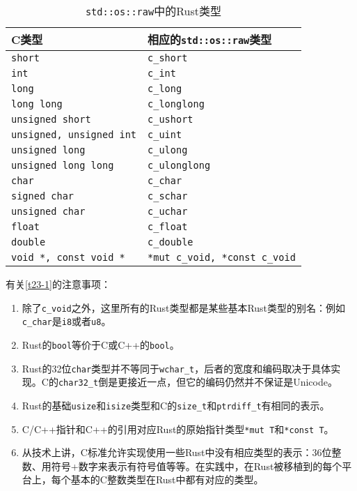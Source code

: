 \begin{table}[htbp]
    \centering
    \caption{\texttt{std::os::raw}中的Rust类型}
    \label{t23-1}
    \begin{tabular}{ll}
        \textbf{C类型}  &   \textbf{相应的\texttt{std::os::raw}类型}    \\
        \hline
        \texttt{short}          &   \texttt{c\_short}   \\
        \rowcolor{tablecolor}
        \texttt{int}            &   \texttt{c\_int}     \\
        \texttt{long}           &   \texttt{c\_long}    \\
        \rowcolor{tablecolor}
        \texttt{long long}      &   \texttt{c\_longlong}    \\
        \texttt{unsigned short} &   \texttt{c\_ushort}  \\
        \rowcolor{tablecolor}
        \texttt{unsigned, unsigned int} &   \texttt{c\_uint}    \\
        \texttt{unsigned long}  &   \texttt{c\_ulong}   \\
        \rowcolor{tablecolor}
        \texttt{unsigned long long}     &   \texttt{c\_ulonglong}   \\
        \texttt{char}           &   \texttt{c\_char}    \\
        \rowcolor{tablecolor}
        \texttt{signed char}    &   \texttt{c\_schar}   \\
        \texttt{unsigned char}  &   \texttt{c\_uchar}   \\
        \rowcolor{tablecolor}
        \texttt{float}           &   \texttt{c\_float}    \\
        \texttt{double}         &   \texttt{c\_double}  \\
        \rowcolor{tablecolor}
        \texttt{void *, const void *}   &   \texttt{*mut c\_void, *const c\_void}   \\
    \end{tabular}
\end{table}

有关\autoref{t23-1}的注意事项：
\begin{enumerate}
    \item 除了\texttt{c\_void}之外，这里所有的Rust类型都是某些基本Rust类型的别名：例如\texttt{c\_char}是\texttt{i8}或者\texttt{u8}。
    \item Rust的\texttt{bool}等价于C或C++的\texttt{bool}。
    \item Rust的32位\texttt{char}类型并不等同于\texttt{wchar\_t}，后者的宽度和编码取决于具体实现。C的\texttt{char32\_t}倒是更接近一点，但它的编码仍然并不保证是Unicode。
    \item Rust的基础\texttt{usize}和\texttt{isize}类型和C的\texttt{size\_t}和\texttt{ptrdiff\_t}有相同的表示。
    \item C/C++指针和C++的引用对应Rust的原始指针类型\texttt{*mut T}和\texttt{*const T}。
    \item 从技术上讲，C标准允许实现使用一些Rust中没有相应类型的表示：36位整数、用符号+数字来表示有符号值等等。在实践中，在Rust被移植到的每个平台上，每个基本的C整数类型在Rust中都有对应的类型。
\end{enumerate}

